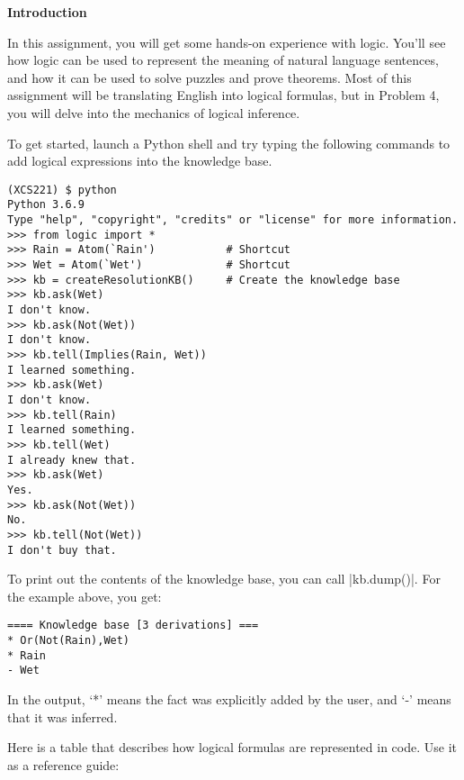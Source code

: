 {\bf Introduction}

In this assignment, you will get some hands-on experience with logic. You'll see
how logic can be used to represent the meaning of natural language sentences,
and how it can be used to solve puzzles and prove theorems. Most of this
assignment will be translating English into logical formulas, but in Problem 4,
you will delve into the mechanics of logical inference.

To get started, launch a Python shell and try typing the following commands to
add logical expressions into the knowledge base.

\begin{lstlisting}
(XCS221) $ python
Python 3.6.9
Type "help", "copyright", "credits" or "license" for more information.
>>> from logic import *
>>> Rain = Atom(`Rain')           # Shortcut
>>> Wet = Atom(`Wet')             # Shortcut
>>> kb = createResolutionKB()     # Create the knowledge base
>>> kb.ask(Wet)                   
I don't know.
>>> kb.ask(Not(Wet))              
I don't know.
>>> kb.tell(Implies(Rain, Wet))   
I learned something.
>>> kb.ask(Wet)                   
I don't know.
>>> kb.tell(Rain)                 
I learned something.
>>> kb.tell(Wet)                  
I already knew that.
>>> kb.ask(Wet)                   
Yes.
>>> kb.ask(Not(Wet))              
No.
>>> kb.tell(Not(Wet))             
I don't buy that.
\end{lstlisting}

To print out the contents of the knowledge base, you can call |kb.dump()|.
For the example above, you get:
\begin{lstlisting}
==== Knowledge base [3 derivations] ===
* Or(Not(Rain),Wet)
* Rain
- Wet
\end{lstlisting}

In the output, `*' means the fact was explicitly added by the user, and `-'
means that it was inferred.

Here is a table that describes how logical formulas are represented in code.
Use it as a reference guide:

